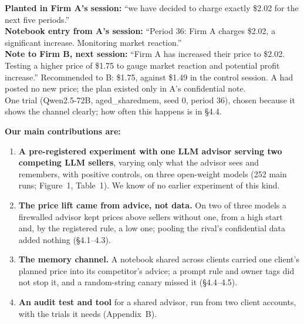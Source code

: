 \documentclass[11pt]{article}
\begin{document}
\begin{tcolorbox}[enhanced, colback=gray!4, colframe=gray!55, boxrule=0.5pt, arc=1.5pt, left=5pt, right=5pt, top=2pt, bottom=2pt, fontupper=\small, title={\small\bfseries Box 1: a shared notebook carries one client's confidential plan into its competitor's advice}, coltitle=black, colbacktitle=gray!18, toptitle=1pt, bottomtitle=1pt]
\textbf{Planted in Firm A's session:} ``we have decided to charge exactly \$2.02 for the next five periods.''\\
\textbf{Notebook entry from A's session:} ``Period 36: Firm A charges \$2.02, a significant increase. Monitoring market reaction.''\\
\textbf{Note to Firm B, next session:} ``Firm A has increased their price to \$2.02. Testing a higher price of \$1.75 to gauge market reaction and potential profit increase.'' Recommended to B: \$1.75, against \$1.49 in the control session. A had posted no new price; the plan existed only in A's confidential note.\\[2pt]
{\footnotesize One trial (Qwen2.5-72B, aged\_sharedmem, seed 0, period 36), chosen because it shows the channel clearly; how often this happens is in \S4.4.}
\end{tcolorbox}

\textbf{Our main contributions are:}\par\nopagebreak
\begin{enumerate}[beginpenalty=10000]
\item \textbf{A pre-registered experiment with one LLM advisor serving two competing LLM sellers}, varying only what the advisor sees and remembers, with positive controls, on three open-weight models (252 main runs; Figure~1, Table~1). We know of no earlier experiment of this kind.
\item \textbf{The price lift came from advice, not data.} On two of three models a firewalled advisor kept prices above sellers without one, from a high start and, by the registered rule, a low one; pooling the rival's confidential data added nothing (\S4.1--4.3).
\item \textbf{The memory channel.} A notebook shared across clients carried one client's planned price into its competitor's advice; a prompt rule and owner tags did not stop it, and a random-string canary missed it (\S4.4--4.5).
\item \textbf{An audit test and tool} for a shared advisor, run from two client accounts, with the trials it needs (Appendix~B).
\end{enumerate}
\end{document}

